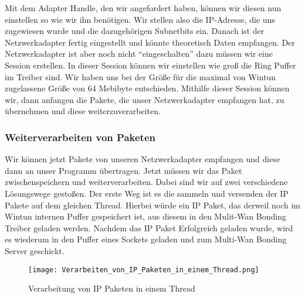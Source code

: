 Mit dem Adapter Handle, den wir angefordert haben, können wir diesen nun einstellen so wie wir ihn benötigen. Wir stellen also die IP-Adresse, die uns zugewiesen wurde und die dazugehörigen Subnetbits ein. Danach ist der Netzwerkadapter fertig eingestellt und könnte theoretisch Daten empfangen.
\newline
\newline
Der Netzwerkadapter ist aber noch nicht “eingeschalten” dazu müssen wir eine Session erstellen. In dieser Session können wir einstellen wie groß die Ring Puffer im Treiber sind. Wir haben uns bei der Größe für die maximal von Wintun zugelassene Größe von 64 Mebibyte entschieden. Mithilfe dieser Session können wir, dann anfangen die Pakete, die unser Netzwerkadapter empfangen hat, zu übernehmen und diese weiterzuverarbeiten.
\subsubsection{Weiterverarbeiten von Paketen}
Wir können jetzt Pakete von unseren Netzwerkadapter empfangen und diese dann an unser Programm übertragen. Jetzt müssen wir das Paket zwischenspeichern und weiterverarbeiten. Dabei sind wir auf zwei verschiedene Lösungswege gestoßen.
\newline
\newline
Der erste Weg ist es die sammeln und versenden der IP Pakete auf dem gleichen Thread. Hierbei würde ein IP Paket, das derweil noch im Wintun internen Puffer gespeichert ist, aus diesem in den Mulit-Wan Bonding Treiber geladen werden. Nachdem das IP Paket Erfolgreich geladen wurde, wird es wiederum in den Puffer eines Sockets geladen und zum Multi-Wan Bonding Server geschickt. 
\newline
\begin{figure}[H]
    \centering
    \texttt{[image: Verarbeiten\_von\_IP\_Paketen\_in\_einem\_Thread.png]}
    \caption[Verarbeitung von IP Paketen in einem Thread]{Verarbeitung von IP Paketen in einem Thread} 
\end{figure}
\ \\
